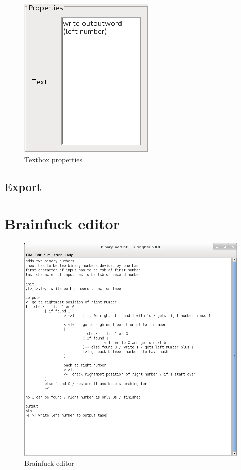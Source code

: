 \documentclass[%
  a4paper,%
  11pt,%
  blue,%
  hyperref	%
  ]{tubsartcl}
\begin{document}
\begin{figure}[!htb]
\begin{center}
\includegraphics[scale=0.5]{graphics_gui/text_properties.png}
\end{center}
\caption{Textbox properties}
\label{pic:text_properties}
\end{figure}

\newpage

\subsection{Export}
\label{sec:export}

\newpage

\section{Brainfuck editor}

\begin{figure}[!htb]
\begin{center}
\includegraphics[scale=0.5]{graphics_gui/brainfuck_editor.png}
\end{center}
\caption{Brainfuck editor}
\label{pic:brainfuck_editor}
\end{figure}
\end{document}
